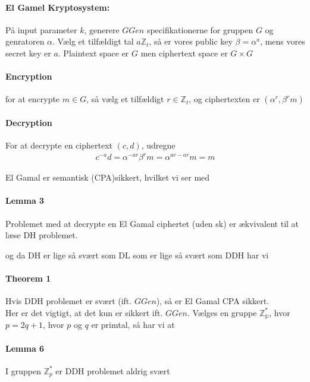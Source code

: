 \documentclass[paper=a4, fontsize=11pt]{scrartcl} %
\numberwithin{equation}{section} %
\numberwithin{figure}{section} %
\numberwithin{table}{section} %
\begin{document}
	\begin{mdframed}
		\paragraph{\textbf{El Gamel Kryptosystem:}} På input parameter $k$, generere $GGen$ specifikationerne for gruppen $G$ og genratoren $\alpha$. Vælg et tilfældigt tal $a\mathbb{Z}_t$, så er vores public key $\beta=\alpha^a$, mens vores secret key er $a$. Plaintext space er $G$ men ciphertext space er $G \times G$ 
		
		\paragraph{\textbf{Encryption}} for at encrypte $m\in G$, så vælg et tilfældigt $r\in\mathbb{Z}_t$, og ciphertexten er $(\alpha^r,\beta^rm)$
		
		\paragraph{\textbf{Decryption}} For at decrypte en ciphertext $(c,d)$, udregne
		\begin{align*}
			c^{-a}d=\alpha^{-ar}\beta^rm=\alpha^{ar-ar}m=m
		\end{align*} 
	\end{mdframed}		
	El Gamal er semantisk (CPA)sikkert, hvilket vi ser med
	
	\paragraph{\textbf{Lemma 3}} Problemet med at decrypte en El Gamal ciphertet (uden sk) er ækvivalent til at læse DH problemet.
	
	og da DH er lige så svært som DL som er lige så svært som DDH har vi
	
	\paragraph{\textbf{Theorem 1}} Hvis DDH problemet er svært (ift. $GGen$), så er El Gamal CPA sikkert. \\

	Her er det vigtigt, at det kun er sikkert ift. $GGen$. Vælges en gruppe $\mathbb{Z_p^*}$, hvor $p=2q+1$, hvor $p$ og $q$ er primtal, så har vi at
	
	\paragraph{\textbf{Lemma 6}} I gruppen $\mathbb{Z}_p^*$ er DDH problemet aldrig svært \\
	
\end{document}
